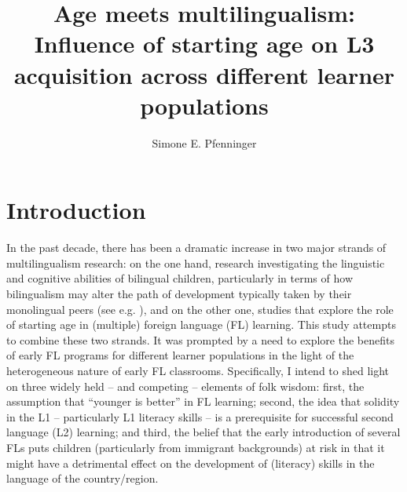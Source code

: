 \documentclass[output=paper,modfonts,nonflat,newtxmath]{langsci/langscibook}
\author{Simone E. Pfenninger\affiliation{University of Salzburg}}
\title{Age meets multilingualism: Influence of starting age on L3 acquisition across different learner populations}
\begin{document}
\maketitle

\section{Introduction}
\label{sec:pfenninger:1}

In the past decade, there has been a dramatic increase in two major strands of multilingualism research: on the one hand, research investigating the linguistic and cognitive abilities of bilingual children, particularly in terms of how bilingualism may alter the path of development typically taken by their monolingual peers (see e.g. \citealt{BialystokFeng2011}), and on the other one, studies that explore the role of starting age in (multiple) foreign language (FL) learning. This study attempts to combine these two strands. It was prompted by a need to explore the benefits of early FL programs for different learner populations in the light of the heterogeneous nature of early FL classrooms. Specifically, I intend to shed light on three widely held – and competing – elements of folk wisdom: first, the assumption that “younger is better” in FL learning; second, the idea that solidity in the L1 – particularly L1 literacy skills – is a prerequisite for successful second language (L2) learning; and third, the belief that the early introduction of several FLs puts children (particularly from immigrant backgrounds) at risk in that it might have a detrimental effect on the development of (literacy) skills in the language of the country/region.
\end{document}
